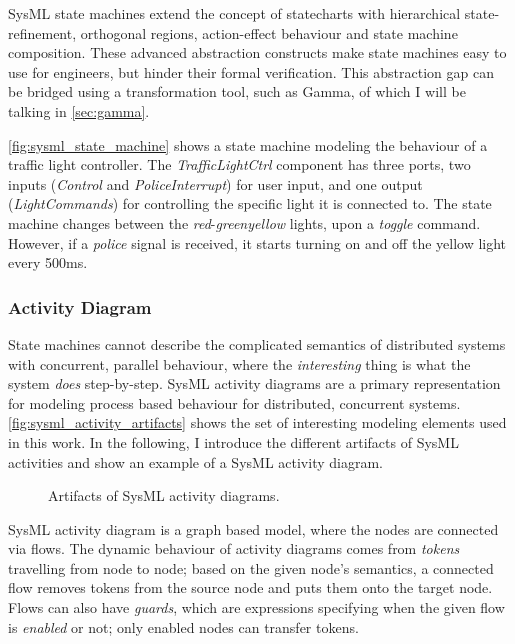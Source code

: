 SysML state machines extend the concept of statecharts with hierarchical state-refinement, orthogonal regions, action-effect behaviour and state machine composition. These advanced abstraction constructs make state machines easy to use for engineers, but hinder their formal verification. This abstraction gap can be bridged using a transformation tool, such as Gamma, of which I will be talking in \autoref{sec:gamma}.

\autoref{fig:sysml_state_machine} shows a state machine modeling the behaviour of a traffic light controller. The \emph{TrafficLightCtrl} component has three ports, two inputs (\emph{Control} and \emph{PoliceInterrupt}) for user input, and one output (\emph{LightCommands}) for controlling the specific light it is connected to. The state machine changes between the \emph{red}-\emph{green}\emph{yellow} lights, upon a \emph{toggle} command. However, if a \emph{police} signal is received, it starts turning on and off the yellow light every 500ms.

\subsubsection*{Activity Diagram}\label{ssec:sysml_activity}

State machines cannot describe the complicated semantics of distributed systems with concurrent, parallel behaviour, where the \emph{interesting} thing is what the system \emph{does} step-by-step. SysML activity diagrams are a primary representation for modeling process based behaviour \cite{omg_sysml} for distributed, concurrent systems. \autoref{fig:sysml_activity_artifacts} shows the set of interesting modeling elements used in this work. In the following, I introduce the different artifacts of SysML activities and show an example of a SysML activity diagram.

\begin{figure}[!ht]
	\centering
	
	\caption{Artifacts of SysML activity diagrams.}
	\label{fig:sysml_activity_artifacts}
\end{figure}

SysML activity diagram is a graph based model, where the nodes are connected via flows. The dynamic behaviour of activity diagrams comes from \emph{tokens} travelling from node to node; based on the given node's semantics, a connected flow removes tokens from the source node and puts them onto the target node. Flows can also have \emph{guards}, which are expressions specifying when the given flow is \emph{enabled} or not; only enabled nodes can transfer tokens.

